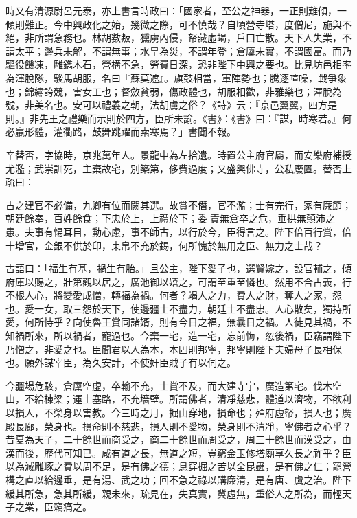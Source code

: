 \begin{pinyinscope}
 時又有清源尉呂元泰，亦上書言時政曰：「國家者，至公之神器，一正則難傾，一傾則難正。今中興政化之始，幾微之際，可不慎哉？自頃營寺塔，度僧尼，施與不絕，非所謂急務也。林胡數叛，獯虜內侵，帑藏虛竭，戶口亡散。天下人失業，不謂太平；邊兵未解，不謂無事；水旱為災，不謂年登；倉廩未實，不謂國富。而乃驅役饑凍，雕鐫木石，營構不急，勞費日深，恐非陛下中興之要也。比見坊邑相率為渾脫隊，駿馬胡服，名曰『蘇莫遮』。旗鼓相當，軍陣勢也；騰逐喧噪，戰爭象也；錦繡誇競，害女工也；督斂貧弱，傷政體也，胡服相歡，非雅樂也；渾脫為號，非美名也。安可以禮義之朝，法胡虜之俗？《詩》云：『京邑翼翼，四方是則。』非先王之禮樂而示則於四方，臣所未諭。《書》：《書》曰：『謀，時寒若。』何必臝形體，灌衢路，鼓舞跳躍而索寒焉？」書聞不報。



 辛替否，字協時，京兆萬年人。景龍中為左拾遺。時置公主府官屬，而安樂府補授尤濫；武崇訓死，主棄故宅，別築第，侈費過度；又盛興佛寺，公私廢匱。替否上疏曰：



 古之建官不必備，九卿有位而闕其選。故賞不僭，官不濫；士有完行，家有廉節；朝廷餘奉，百姓餘食；下忠於上，上禮於下；委責無倉卒之危，垂拱無顛沛之患。夫事有惕耳目，動心慮，事不師古，以行於今，臣得言之。陛下倍百行賞，倍十增官，金銀不供於印，束帛不充於錫，何所愧於無用之臣、無力之士哉？



 古語曰：「福生有基，禍生有胎。」且公主，陛下愛子也，選賢嫁之，設官輔之，傾府庫以賜之，壯第觀以居之，廣池御以嬉之，可謂至重至憐也。然用不合古義，行不根人心，將變愛成憎，轉福為禍。何者？竭人之力，費人之財，奪人之家，怨也。愛一女，取三怨於天下，使邊疆士不盡力，朝廷士不盡忠。人心散矣，獨持所愛，何所恃乎？向使魯王賞同諸婿，則有今日之福，無曩日之禍。人徒見其禍，不知禍所來，所以禍者，寵過也。今棄一宅，造一宅，忘前悔，忽後禍，臣竊謂陛下乃憎之，非愛之也。臣聞君以人為本，本固則邦寧，邦寧則陛下夫婦母子長相保也。願外謀宰臣，為久安計，不使奸臣賊子有以伺之。



 今疆場危駭，倉廩空虛，卒輸不充，士賞不及，而大建寺宇，廣造第宅。伐木空山，不給棟梁；運土塞路，不充墻壁。所謂佛者，清凈慈悲，體道以濟物，不欲利以損人，不榮身以害教。今三時之月，掘山穿地，損命也；殫府虛帑，損人也；廣殿長廊，榮身也。損命則不慈悲，損人則不愛物，榮身則不清凈，寧佛者之心乎？昔夏為天子，二十餘世而商受之，商二十餘世而周受之，周三十餘世而漢受之，由漢而後，歷代可知已。咸有道之長，無道之短，豈窮金玉修塔廟享久長之祚乎？臣以為減雕琢之費以周不足，是有佛之德；息穿掘之苦以全昆蟲，是有佛之仁；罷營構之直以給邊垂，是有湯、武之功；回不急之祿以購廉清，是有唐、虞之治。陛下緩其所急，急其所緩，親未來，疏見在，失真實，冀虛無，重俗人之所為，而輕天子之業，臣竊痛之。




\end{pinyinscope}
